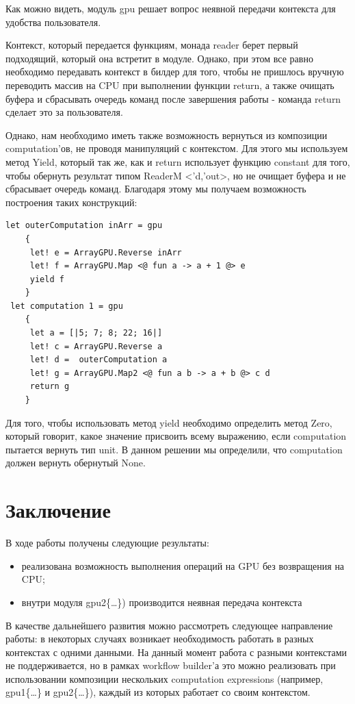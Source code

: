 \documentclass[14pt]{matmex-diploma-custom}
\begin{document}
Как можно видеть, модуль gpu решает вопрос неявной передачи контекста для удобства пользователя.

Контекст, который передается функциям, монада reader берет первый подходящий, который она встретит в модуле. 
Однако, при этом все равно необходимо передавать контекст в билдер для того, чтобы не пришлось вручную переводить массив на CPU при выполнении функции return, а также очищать буфера и сбрасывать очередь команд после завершения работы - команда return сделает это за пользователя.

Однако, нам необходимо иметь также возможность вернуться из композиции computation’ов, не проводя манипуляций с контекстом. Для этого мы используем метод Yield, который так же, как и return использует функцию constant для того, чтобы обернуть результат типом ReaderM <’d,’out>, но не очищает буфера и не сбрасывает очередь команд.
Благодаря этому мы получаем возможность построения таких конструкций:
\begin{verbatim}
let outerComputation inArr = gpu 
    {                             
     let! e = ArrayGPU.Reverse inArr
     let! f = ArrayGPU.Map <@ fun a -> a + 1 @> e
     yield f
    }    
 let computation 1 = gpu 
    { 
     let a = [|5; 7; 8; 22; 16|]             
     let! c = ArrayGPU.Reverse a
     let! d =  outerComputation a
     let! g = ArrayGPU.Map2 <@ fun a b -> a + b @> c d
     return g
    } 

\end{verbatim}
Для того, чтобы использовать метод yield необходимо определить метод Zero, который говорит, какое значение присвоить всему выражению, если computation пытается вернуть тип unit. В данном решении мы определили, что computation должен вернуть обернутый None.

\section*{Заключение}
В ходе работы получены следующие результаты:
\begin{itemize}
    \item реализована возможность выполнения операций на GPU без возвращения на CPU;
    \item внутри модуля gpu2\{\ldots\}) производится неявная передача контекста 
\end{itemize}

В качестве дальнейшего развития можно рассмотреть следующее направление работы: в некоторых случаях возникает необходимость работать в разных контекстах с одними данными. На данный момент работа с разными контекстами не поддерживается, но в рамках workflow builder’а это можно реализовать при использовании композиции нескольких computation expressions (например, gpu1\{\ldots\} и gpu2\{\ldots\}), каждый из которых работает со своим контекстом. 

\setmonofont[Mapping=tex-text]{CMU Typewriter Text}


\end{document}

